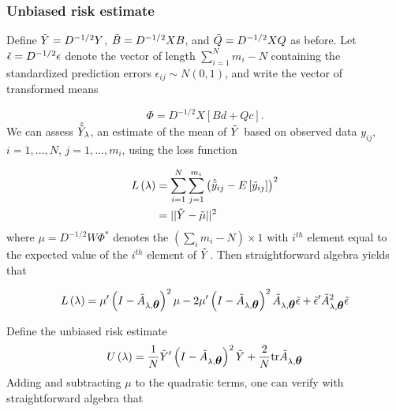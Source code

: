 \subsubsection{Unbiased risk estimate}

Define  $\tilde{Y} = D^{-1/2} Y$, $\tilde{B} = D^{-1/2} X B $, and $\tilde{Q} = D^{-1/2} X Q$ as before. Let $\tilde{\epsilon} = D^{-1/2} \epsilon$ denote the vector of length  $\sum_{i = 1}^Nm_i - N$ containing the standardized prediction errors $\epsilon_{ij} \sim N\left(0,1\right)$, and write the vector of transformed means 

\begin{equation} 
\Phi = D^{-1/2} X \left[ Bd + Qc \right].
\end{equation}
\noindent
We can assess $\hat{\tilde{Y}}_\lambda$, an estimate of the mean of $\tilde{Y}$ based on observed data $y_{ij}$, $i = 1,\dots, N$, $j = 1,\dots, m_i$, using the loss function

\begin{align}
\begin{split}
L\left(\lambda\right) &= \sum_{i = 1}^N \sum_{j = 1}^{m_i} \left(\hat{\tilde{y}}_{ij} - E\left[\tilde{y}_{ij}\right] \right)^2\\
&= \vert \vert \tilde{Y} - \tilde{\mu} \vert \vert^2
\end{split}
\end{align}
\noindent
where $\mu = D^{-1/2}W \Phi^*$ denotes the $\left( \sum \limits_{i} m_i - N\right) \times 1$ with $i^{th}$ element equal to the expected value of the  $i^{th}$ element of $\tilde{Y}$.  Then straightforward algebra yields that 

\begin{align} 
L\left(\lambda\right) = \mu'\left( I - \tilde{A}_{\lambda,\mbox{\boldmath $\theta$}} \right)^2\mu - 2\mu'\left( I - \tilde{A}_{\lambda,\mbox{\boldmath $\theta$}} \right)^2 \tilde{A}_{\lambda,\mbox{\boldmath $\theta$}} \tilde{\epsilon} + \tilde{\epsilon}' \tilde{A}_{\lambda,\mbox{\boldmath $\theta$}}^2 \tilde{\epsilon}
\end{align}

Define the unbiased risk estimate
\begin{equation} 
U\left(\lambda\right) = \frac{1}{N}\tilde{Y}'\left( I - \tilde{A}_{\lambda,\mbox{\boldmath $\theta$}} \right)^2\tilde{Y} + \frac{2}{N}\mbox{tr}\tilde{A}_{\lambda,\mbox{\boldmath $\theta$}}
\end{equation}
 \noindent
Adding and subtracting $\mu$ to the quadratic terms, one can verify with straightforward algebra that

